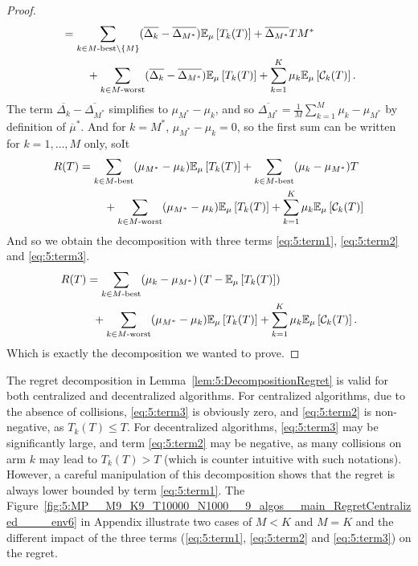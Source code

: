 \begin{proof}
\begin{align*}
    &= \sum_{k \in M\text{-}\mathrm{best}\setminus\{M\}} (\overline{\Delta_k} - \overline{\Delta_{M^*}}) \mathbb{E}_{\mu}\left[ T_k(T) \right]
      + \overline{\Delta_{M^*}} T M^* \\
      &\;\;\;\;\;\;\;\; + \sum_{k \in M\text{-}\mathrm{worst}} (\overline{\Delta_k} - \overline{\Delta_{M^*}}) \mathbb{E}_{\mu}\left[ T_k(T) \right]
      + \sum_{k=1}^{K} \mu_k \mathbb{E}_{\mu}\left[ \mathcal{C}_k(T) \right].
  \end{align*}
  The term $\overline{\Delta_k} - \overline{\Delta_{M^*}}$ simplifies to $\mu_{M^*} - \mu_k$, and so $\overline{\Delta_{M^*}} = \frac{1}{M} \sum_{k=1}^{M} \mu_k - \mu_{M^*}$ by definition of $\overline{\mu}^*$. And for $k=M^*$, $\mu_{M^*} - \mu_k = 0$, so the first sum can be written for $k = 1,\dots,M$ only, soIt
  \begin{align*}
    R(T)
    &= \sum_{k \in M\text{-}\mathrm{best}} (\mu_{M^*} - \mu_k) \mathbb{E}_{\mu}\left[ T_k(T) \right]
      + \sum_{k \in M\text{-}\mathrm{best}} (\mu_k - \mu_{M^*}) T \\
      &\;\;\;\;\;\;\;\; + \sum_{k \in M\text{-}\mathrm{worst}} (\mu_{M^*} - \mu_k) \mathbb{E}_{\mu}\left[ T_k(T) \right]
      + \sum_{k=1}^{K} \mu_k \mathbb{E}_{\mu}\left[ \mathcal{C}_k(T) \right]
  \end{align*}
  And so we obtain the decomposition with three terms \ref{eq:5:term1}, \ref{eq:5:term2} and \ref{eq:5:term3}.
  \begin{align*}
  R(T)
    & = \sum_{k \in M\text{-}\mathrm{best}} (\mu_k - \mu_{M^*}) \left(T - \mathbb{E}_{\mu}\left[ T_k(T) \right]\right) \\
      & \;\; + \sum_{k \in M\text{-}\mathrm{worst}} (\mu_{M^*} - \mu_k) \mathbb{E}_{\mu}\left[ T_k(T) \right]
      + \sum_{k=1}^{K} \mu_k \mathbb{E}_{\mu}\left[ \mathcal{C}_k(T) \right].
  \end{align*}
  Which is exactly the decomposition we wanted to prove.
\end{proof}


The regret decomposition in Lemma~\ref{lem:5:DecompositionRegret} is valid for both centralized and decentralized algorithms.
For centralized algorithms, due to the absence of collisions, \ref{eq:5:term3} is obviously zero, and \ref{eq:5:term2} is non-negative, as $T_k(T) \leq T$. For decentralized algorithms, \ref{eq:5:term3} may be significantly large, and term \ref{eq:5:term2} may be negative, as many collisions on arm $k$ may lead to $T_k(T) > T$ (which is counter intuitive with such notations).
However, a careful manipulation of this decomposition shows that the regret is always lower bounded by term \ref{eq:5:term1}.
The Figure~\ref{fig:5:MP__M9_K9_T10000_N1000__9_algos__main_RegretCentralized____env6} in Appendix illustrate two cases of $M<K$ and $M=K$ and the different impact of the three terms (\ref{eq:5:term1}, \ref{eq:5:term2} and \ref{eq:5:term3}) on the regret.

